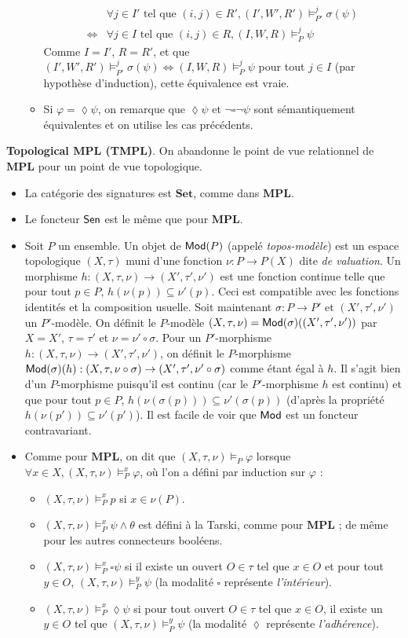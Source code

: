 \documentclass[11pt,a4paper]{report}
\newcommand{\ph}{\varphi}
\newcommand{\itemz}{\item[$\triangleright$]}
\newcommand{\gr}{\textbf}
\newcommand{\il}{\textit}
\renewcommand{\iff}{\Leftrightarrow}
\newcommand{\info}[1]{\text{{\fontfamily{lmss}\selectfont #1}}}
\newcommand{\Mod}{\info{Mod}}
\newcommand{\Sen}{\info{Sen}}
\newcommand{\1}{\mathbbm{1}}
\begin{document}
\begin{itemize}
\begin{itemize}
\begin{align*} & \forall j \in I' \text{ tel que } (i,j) \in R', (I',W',R') \models^j_{P'} \sigma(\psi) \\ \iff & \forall j \in I \text{ tel que } (i,j) \in R, (I,W,R) \models^j_P \psi
\end{align*}
Comme $I = I'$, $R = R'$, et que $(I',W',R') \models^j_{P'} \sigma(\psi) \iff (I,W,R) \models^j_{P} \psi$ pour tout $j \in I$ (par hypothèse d'induction), cette équivalence est vraie.
\item Si $\ph = \lozenge \psi$, on remarque que $\lozenge \psi$ et $\neg \square \neg \psi$ sont sémantiquement équivalentes et on utilise les cas précédents.
\end{itemize}
\end{itemize}
\gr{Topological MPL (TMPL)}. On abandonne le point de vue relationnel de $\gr{MPL}$ pour un point de vue topologique.
\begin{itemize}
\itemz La catégorie des signatures est $\gr{Set}$, comme dans $\gr{MPL}$.
\itemz Le foncteur $\Sen$ est le même que pour $\gr{MPL}$.
\itemz Soit $P$ un ensemble. Un objet de $\Mod(P)$ (appelé \il{topos-modèle}) est un espace topologique $(X,\tau)$ muni d'une fonction $\nu : P \to P(X)$ dite \il{de valuation}. Un morphisme $h : (X,\tau,\nu) \to (X',\tau',\nu')$ est une fonction continue telle que pour tout $p \in P$, $h(\nu(p)) \subseteq \nu'(p)$. Ceci est compatible avec les fonctions identités et la composition usuelle. Soit maintenant $\sigma : P \to P'$ et $(X',\tau',\nu')$ un $P'$-modèle. On définit le $P$-modèle $(X,\tau,\nu) = \Mod(\sigma)((X',\tau',\nu'))$ par $X = X'$, $\tau = \tau'$ et $\nu = \nu' \circ \sigma$. Pour un $P'$-morphisme $h : (X,\tau,\nu) \to (X',\tau',\nu')$, on définit le $P$-morphisme $\Mod(\sigma)(h) : (X,\tau, \nu\circ\sigma) \to (X',\tau',\nu'\circ\sigma)$ comme étant égal à $h$. Il s'agit bien d'un $P$-morphisme puisqu'il est continu (car le $P'$-morphisme $h$ est continu) et que pour tout $p \in P$, $h(\nu(\sigma(p))) \subseteq \nu'(\sigma(p))$ (d'après la propriété $h(\nu(p')) \subseteq \nu'(p')$). Il est facile de voir que $\Mod$ est un foncteur contravariant.
\itemz Comme pour $\gr{MPL}$, on dit que $(X,\tau,\nu) \models_P \ph$ lorsque $\forall x \in X, (X,\tau,\nu) \models_P^x \ph$, où l'on a défini par induction sur $\ph$ :
\begin{itemize}
\setlength\itemsep{-0.3em}
\item $(X,\tau,\nu) \models_P^x p$ si $x \in \nu(P)$.
\item $(X,\tau,\nu) \models_P^x \psi \wedge \theta$ est défini à la Tarski, comme pour $\gr{MPL}$ ; de même pour les autres connecteurs booléens.
\item $(X,\tau,\nu) \models_P^x \square \psi$ si il existe un ouvert $O \in \tau$ tel que $x \in O$ et pour tout $y \in O$, $(X,\tau,\nu) \models_P^y \psi$ (la modalité $\square$ représente \il{l'intérieur}).
\item $(X,\tau,\nu) \models_P^x \lozenge \psi$ si pour tout ouvert $O \in \tau$ tel que $x \in O$, il existe un $y \in O$ tel que $(X,\tau,\nu) \models_P^y \psi$ (la modalité $\lozenge$ représente \il{l'adhérence}).
\end{itemize}
\end{itemize}
\end{document}
